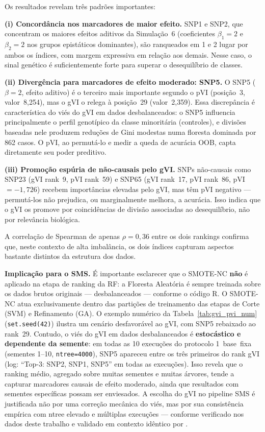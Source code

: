 \documentclass[
    12pt,
    a4paper,
    oneside,
    english,
    french,
    spanish,
    brazil
    ]{abntex2}
\newcommand{\novo}[1]{\textcolor{corNova}{#1}}
\begin{document}
\novo{Os resultados revelam três padrões importantes:}

\novo{\textbf{(i) Concordância nos marcadores de maior efeito.} SNP1 e SNP2, que concentram os maiores efeitos aditivos da Simulação~6 (coeficientes $\beta_1=2$ e $\beta_2=2$ nos grupos epistáticos dominantes), são ranqueados em 1\textordmasculine{} e 2\textordmasculine{} lugar por ambos os índices, com margem expressiva em relação aos demais. Nesse caso, o sinal genético é suficientemente forte para superar o desequilíbrio de classes.}

\novo{\textbf{(ii) Divergência para marcadores de efeito moderado: SNP5.} O SNP5 ($\beta=2$, efeito aditivo) é o terceiro mais importante segundo o pVI (posição~3, valor~8,254), mas o gVI o relega à posição~29 (valor~2,359). Essa discrepância é característica do viés do gVI em dados desbalanceados: o SNP5 influencia principalmente o perfil genotípico da classe minoritária (controles), e divisões baseadas nele produzem reduções de Gini modestas numa floresta dominada por 862 casos. O pVI, ao permutá-lo e medir a queda de acurácia OOB, capta diretamente seu poder preditivo.}

\novo{\textbf{(iii) Promoção espúria de não-causais pelo gVI.} SNPs não-causais como SNP23 (gVI rank~9, pVI rank~59) e SNP65 (gVI rank~17, pVI rank~86, pVI~$=-1{,}726$) recebem importâncias elevadas pelo gVI, mas têm pVI negativo --- permutá-los não prejudica, ou marginalmente melhora, a acurácia. Isso indica que o gVI os promove por coincidências de divisão associadas ao desequilíbrio, não por relevância biológica.}

\novo{A correlação de Spearman de apenas $\rho = 0{,}36$ entre os dois rankings confirma que, neste contexto de alta imbalância, os dois índices capturam aspectos bastante distintos da estrutura dos dados.}

\novo{\textbf{Implicação para o SMS.} É importante esclarecer que o SMOTE-NC \textbf{não} é aplicado na etapa de ranking da RF: a Floresta Aleatória é sempre treinada sobre os dados brutos originais --- desbalanceados --- conforme o código R. O SMOTE-NC atua exclusivamente dentro das partições de treinamento das etapas de Corte (SVM) e Refinamento (GA). O exemplo numérico da Tabela~\ref{tab:gvi_pvi_num} (\texttt{set.seed(42)}) ilustra um cenário desfavorável ao gVI, com SNP5 rebaixado ao rank~29. Contudo, o viés do gVI em dados desbalanceados é \textbf{estocástico e dependente da semente}: em todas as 10 execuções do protocolo 1~base~fixa (sementes 1--10, \texttt{ntree=4000}), SNP5 apareceu entre os três primeiros do rank gVI (log: ``Top-3: SNP2, SNP1, SNP5'' em todas as execuções). Isso revela que o ranking médio, agregado sobre muitas sementes e muitas árvores, tende a capturar marcadores causais de efeito moderado, ainda que resultados com sementes específicas possam ser enviesados. A escolha do gVI no pipeline SMS é justificada não por uma correção mecânica do viés, mas por sua consistência empírica com ntree elevado e múltiplas execuções --- conforme verificado nos dados deste trabalho e validado em contexto idêntico por \citeonline{Oliveira2015}.}
\end{document}
